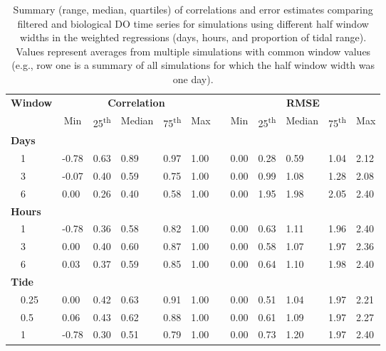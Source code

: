 \documentclass[letterpaper,12pt,oneside]{article}\usepackage[]{graphicx}\usepackage[]{color}
\begin{document}
\begin{table}[!tbp]
\caption{Summary (range, median, quartiles) of correlations and error estimates comparing filtered and biological \ac{DO} time series for simulations using different half window widths in the weighted regressions (days, hours, and proportion of tidal range).  Values represent averages from multiple simulations with common window values (e.g., row one is a summary of all simulations for which the half window width was one day).\label{tab:dtd_perf2}} 
\begin{center}
\begin{tabular}{llllllclllll}
\hline\hline
\multicolumn{1}{l}{\bfseries Window}&\multicolumn{5}{c}{\bfseries Correlation}&\multicolumn{1}{c}{\bfseries }&\multicolumn{5}{c}{\bfseries RMSE}\tabularnewline
\cline{2-6} \cline{8-12}
\multicolumn{1}{l}{}&\multicolumn{1}{c}{Min}&\multicolumn{1}{c}{25\textsuperscript{th}}&\multicolumn{1}{c}{Median}&\multicolumn{1}{c}{75\textsuperscript{th}}&\multicolumn{1}{c}{Max}&\multicolumn{1}{c}{}&\multicolumn{1}{c}{Min}&\multicolumn{1}{c}{25\textsuperscript{th}}&\multicolumn{1}{c}{Median}&\multicolumn{1}{c}{75\textsuperscript{th}}&\multicolumn{1}{c}{Max}\tabularnewline
\hline
{\bfseries Days}&&&&&&&&&&&\tabularnewline
~~1&-0.78&0.63&0.89&0.97&1.00&&0.00&0.28&0.59&1.04&2.12\tabularnewline
~~3&-0.07&0.40&0.59&0.75&1.00&&0.00&0.99&1.08&1.28&2.08\tabularnewline
~~6& 0.00&0.26&0.40&0.58&1.00&&0.00&1.95&1.98&2.05&2.40\tabularnewline
\hline
{\bfseries Hours}&&&&&&&&&&&\tabularnewline
~~1&-0.78&0.36&0.58&0.82&1.00&&0.00&0.63&1.11&1.96&2.40\tabularnewline
~~3& 0.00&0.40&0.60&0.87&1.00&&0.00&0.58&1.07&1.97&2.36\tabularnewline
~~6& 0.03&0.37&0.59&0.85&1.00&&0.00&0.64&1.10&1.98&2.40\tabularnewline
\hline
{\bfseries Tide}&&&&&&&&&&&\tabularnewline
~~0.25& 0.00&0.42&0.63&0.91&1.00&&0.00&0.51&1.04&1.97&2.21\tabularnewline
~~0.5& 0.06&0.43&0.62&0.88&1.00&&0.00&0.61&1.09&1.97&2.27\tabularnewline
~~1&-0.78&0.30&0.51&0.79&1.00&&0.00&0.73&1.20&1.97&2.40\tabularnewline
\hline
\end{tabular}\end{center}

\end{table}
\end{document}
